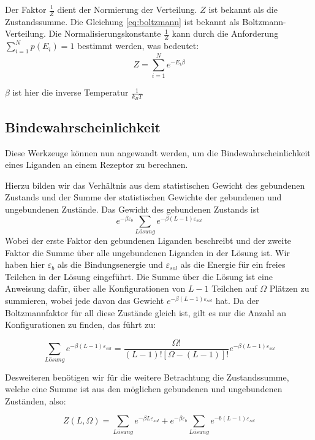 \documentclass[bachelor,       %
               twoside,        %
               BCOR10mm,       %
               english,ngerman, %
               ]{GAUBM}
\begin{document}
Der Faktor $\frac{1}{Z}$ dient der Normierung der Verteilung.
$Z$ ist bekannt als die Zustandssumme. Die Gleichung \ref{eq:boltzmann}
ist bekannt als Boltzmann-Verteilung. Die Normalisierungskonstante $\frac{1}{Z}$
kann durch die Anforderung $ \sum_{i=1}^{N} p(E_i) = 1$ bestimmt werden, was bedeutet:
\begin{equation}
Z = \sum_{i=1}^{N}e^{-E_i\beta}
\end{equation}

$\beta$ ist hier die inverse Temperatur $\frac{1}{k_BT}$

\subsection{Bindewahrscheinlichkeit}
Diese Werkzeuge können nun angewandt werden, um die Bindewahrscheinlichkeit eines
Liganden an einem Rezeptor zu berechnen.

Hierzu bilden wir das Verhältnis aus dem statistischen Gewicht des gebundenen
Zustands und der Summe der statistischen Gewichte der gebundenen und ungebundenen
Zustände. Das Gewicht des gebundenen Zustands ist
$$e^{-\beta\varepsilon_b} \sum_{Lösung}e^{-\beta(L-1)\varepsilon_{sol}}$$
Wobei der erste Faktor den gebundenen Liganden beschreibt und der zweite Faktor die Summe
über alle ungebundenen Liganden in der Lösung ist. Wir haben hier $\varepsilon_b$ als
die Bindungsenergie und $\varepsilon_{sol}$ als die Energie für ein freies Teilchen
in der Lösung eingeführt. Die Summe über die Lösung ist eine Anweisung dafür,
über alle Konfigurationen von $L-1$ Teilchen auf $\Omega$ Plätzen zu summieren,
wobei jede davon das Gewicht $e^{-\beta(L-1)\varepsilon_{sol}}$ hat.
Da der Boltzmannfaktor für all diese Zustände gleich ist, gilt es nur
die Anzahl an Konfigurationen zu finden, das führt zu:

\begin{equation}
\label{gebundenerligand}
\sum_{Lösung}e^{-\beta(L-1)\varepsilon_{sol}} = \frac{\Omega!}{(L-1)![\Omega-(L-1)]!}e^{-\beta(L-1)\varepsilon_{sol}}
\end{equation}

Desweiteren benötigen wir für die weitere Betrachtung die Zustandssumme,
welche eine Summe ist aus den möglichen gebundenen und ungebundenen Zuständen, also:

\begin{equation}
Z(L,\Omega) = \sum_{Lösung}e^{-\beta L\varepsilon_{sol}} + e^{-\beta\varepsilon_b}\sum_{Lösung}e^{-b(L-1)\varepsilon_{sol}}
\end{equation}
\end{document}
